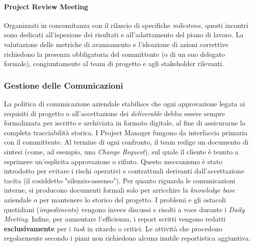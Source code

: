 \documentclass[12pt, a4paper]{article}
\begin{document}
\paragraph{Project Review Meeting}
Organizzati in concomitanza con il rilascio di specifiche \textit{milestone}, questi incontri sono dedicati all'ispezione dei risultati e all'adattamento del piano di lavoro. La valutazione delle metriche di avanzamento e l'ideazione di azioni correttive richiedono la presenza obbligatoria del committente (o di un suo delegato formale), congiuntamente al team di progetto e agli stakeholder rilevanti.

\subsubsection{Gestione delle Comunicazioni}
La politica di comunicazione aziendale stabilisce che ogni approvazione legata ai requisiti di progetto o all'accettazione dei \textit{deliverable} debba essere sempre formalizzata per iscritto e archiviata in formato digitale, al fine di assicurarne la completa tracciabilità storica.
I Project Manager fungono da interfaccia primaria con il committente. Al termine di ogni confronto, il team redige un documento di sintesi (come, ad esempio, una \textit{Change Request}), sul quale il cliente è tenuto a esprimere un'esplicita approvazione o rifiuto. Questo meccanismo è stato introdotto per evitare i rischi operativi e contrattuali derivanti dall'accettazione tacita (il cosiddetto "silenzio-assenso").
Per quanto riguarda le comunicazioni interne, si producono documenti formali solo per arricchire la \textit{knowledge base} aziendale o per mantenere lo storico del progetto. I problemi e gli ostacoli quotidiani (\textit{impediments}) vengono invece discussi e risolti a voce durante i \textit{Daily Meeting}. 
Infine, per aumentare l'efficienza, i report scritti vengono redatti \textbf{esclusivamente} per i \textit{task} in ritardo o critici. Le attività che procedono regolarmente secondo i piani non richiedono alcuna inutile reportistica aggiuntiva.
\end{document}
